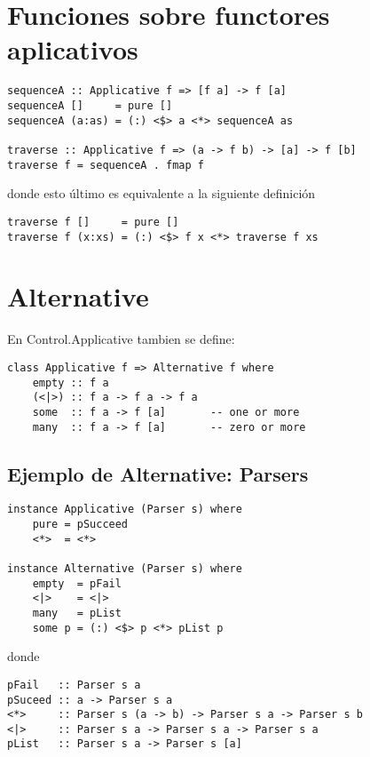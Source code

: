 \documentclass{article}
\newcommand{\imp}[1]{\textcolor{color1}{#1}}
\begin{document}
\section{Funciones sobre functores aplicativos}\label{sec:funciones_sobre_functores_aplicativos}

\begin{lstlisting}
sequenceA :: Applicative f => [f a] -> f [a]
sequenceA []     = pure []
sequenceA (a:as) = (:) <$> a <*> sequenceA as

traverse :: Applicative f => (a -> f b) -> [a] -> f [b]
traverse f = sequenceA . fmap f
\end{lstlisting}
    
donde esto último es equivalente a la siguiente definición
\begin{lstlisting}    
traverse f []     = pure []
traverse f (x:xs) = (:) <$> f x <*> traverse f xs
\end{lstlisting}

\section{Alternative}\label{sec:alternative}

\noindent En \imp{Control.Applicative} tambien se define:

\begin{lstlisting}
class Applicative f => Alternative f where
    empty :: f a
    (<|>) :: f a -> f a -> f a
    some  :: f a -> f [a]       -- one or more
    many  :: f a -> f [a]       -- zero or more
\end{lstlisting}

\subsection{Ejemplo de Alternative: Parsers}\label{subsec:ejemplo_de_alternative_parsers}

\begin{lstlisting}
instance Applicative (Parser s) where
    pure = pSucceed
    <*>  = <*>

instance Alternative (Parser s) where
    empty  = pFail
    <|>    = <|>
    many   = pList
    some p = (:) <$> p <*> pList p
\end{lstlisting}

donde

\begin{lstlisting}
pFail   :: Parser s a
pSuceed :: a -> Parser s a
<*>     :: Parser s (a -> b) -> Parser s a -> Parser s b
<|>     :: Parser s a -> Parser s a -> Parser s a
pList   :: Parser s a -> Parser s [a]
\end{lstlisting}
\end{document}
